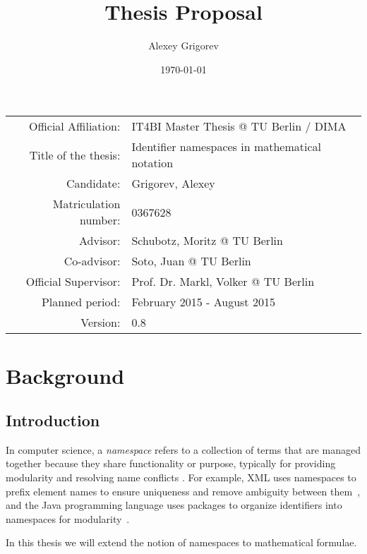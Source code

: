 \documentclass[12pt,a4paper]{article}
\begin{document}
\title{Thesis Proposal}
\author{Alexey Grigorev}
\date{\today}
\maketitle

\begin{tabular}{|r|l|}
  \hline
  Official Affiliation: & IT4BI Master Thesis @ TU Berlin / DIMA \\
  Title of the thesis: & Identifier namespaces in mathematical notation \\
  Candidate: & Grigorev, Alexey \\
  Matriculation number:	& 0367628 \\
  Advisor:	& Schubotz, Moritz @ TU Berlin \\
  Co-advisor:	& Soto, Juan @ TU Berlin \\
  Official Supervisor: &	Prof. Dr. Markl, Volker @ TU Berlin \\
  Planned period: & February 2015 - August 2015 \\
  Version: & 0.8 \\
  \hline
\end{tabular}


\section{Background}
\subsection{Introduction}

In computer science, a \emph{namespace} refers to a collection of terms that are managed together because they share functionality or purpose, typically for providing modularity and resolving name conflicts \cite{source:duval02}. For example, XML uses namespaces to prefix element names to ensure uniqueness and remove ambiguity between them~\cite{source:xml_bray99}, and the Java programming language uses packages to organize identifiers into namespaces for modularity~\cite{source:java_gosling14}.

In this thesis we will extend the notion of namespaces to mathematical formulae.
\end{document}
